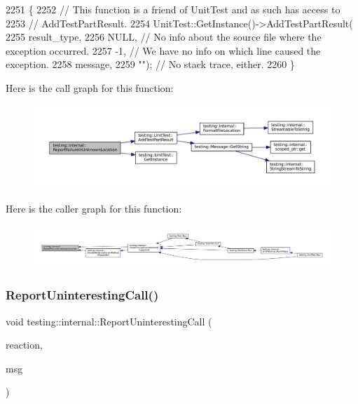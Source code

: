 \begin{DoxyCode}
2251                                                               \{
2252   \textcolor{comment}{// This function is a friend of UnitTest and as such has access to}
2253   \textcolor{comment}{// AddTestPartResult.}
2254   UnitTest::GetInstance()->AddTestPartResult(
2255       result\_type,
2256       NULL,  \textcolor{comment}{// No info about the source file where the exception occurred.}
2257       -1,    \textcolor{comment}{// We have no info on which line caused the exception.}
2258       message,
2259       \textcolor{stringliteral}{""});   \textcolor{comment}{// No stack trace, either.}
2260 \}
\end{DoxyCode}
Here is the call graph for this function\+:
\nopagebreak
\begin{figure}[H]
\begin{center}
\leavevmode
\includegraphics[width=350pt]{namespacetesting_1_1internal_a85f6ff0e40f9a5f10af66a73cf1364fa_cgraph}
\end{center}
\end{figure}
Here is the caller graph for this function\+:
\nopagebreak
\begin{figure}[H]
\begin{center}
\leavevmode
\includegraphics[width=350pt]{namespacetesting_1_1internal_a85f6ff0e40f9a5f10af66a73cf1364fa_icgraph}
\end{center}
\end{figure}
\mbox{\label{namespacetesting_1_1internal_a8d99a1e87d0cea563b2bfad8a4e65276}} 
\subsubsection{\texorpdfstring{Report\+Uninteresting\+Call()}{ReportUninterestingCall()}}
{\footnotesize\ttfamily void testing\+::internal\+::\+Report\+Uninteresting\+Call (\begin{DoxyParamCaption}\item[{\hyperlink{namespacetesting_1_1internal_adfcd859062983a889f4bd18e6977357e}{Call\+Reaction}}]{reaction,  }\item[{const \hyperlink{namespacetesting_1_1internal_a8e8ff5b11e64078831112677156cb111}{string} \&}]{msg }\end{DoxyParamCaption})}



